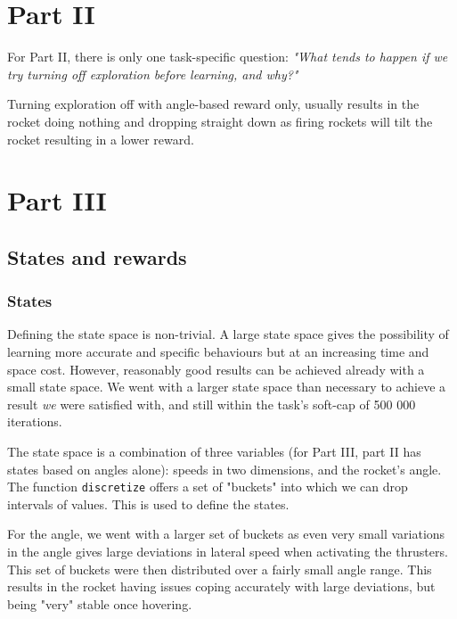 
\section{Part II}

For Part II, there is only one task-specific question: \emph{"What tends to happen if we try turning off exploration before learning, and why?"}

Turning exploration off with angle-based reward only, usually results in the rocket doing nothing and dropping straight down as firing rockets will tilt the rocket resulting in a lower reward.

\section{Part III}

\subsection{States and rewards}
\subsubsection{States}
Defining the state space is non-trivial. A large state space gives the possibility of learning more accurate and specific behaviours but at an increasing time and space cost. However, reasonably good results can be achieved already with a small state space. We went with a larger state space than necessary to achieve a result \emph{we} were satisfied with, and still within the task's soft-cap of 500 000 iterations.

The state space is a combination of three variables (for Part III, part II has states based on angles alone): speeds in two dimensions, and the rocket's angle. The function \verb=discretize= offers a set of "buckets" into which we can drop intervals of values. This is used to define the states.

For the angle, we went with a larger set of buckets as even very small variations in the angle gives large deviations in lateral speed when activating the thrusters. This set of buckets were then distributed over a fairly small angle range. This results in the rocket having issues coping accurately with large deviations, but being "very" stable once hovering.


